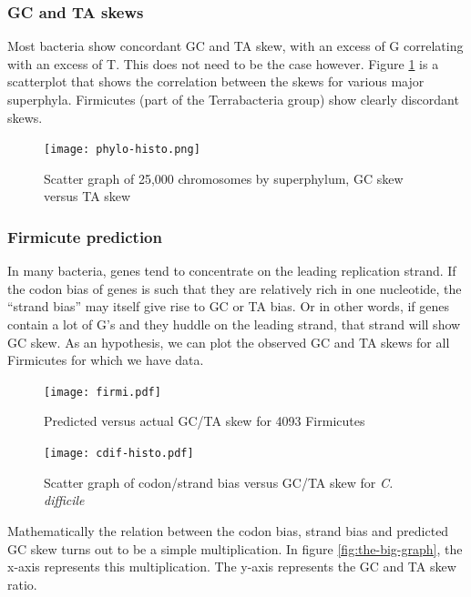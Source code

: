 \documentclass[fleqn,10pt]{wlscirep}
\begin{document}
\subsubsection*{GC and TA skews}
Most bacteria show concordant GC and TA skew, with an excess of G correlating with an excess of T. This does not need to be the case however. Figure \ref{fig:gc-ta-scatter} is a scatterplot that shows the correlation between the skews for various major superphyla. Firmicutes (part of the Terrabacteria group) show clearly discordant skews.

\begin{figure}[ht]
\centering
\texttt{[image: phylo-histo.png]}
\caption{Scatter graph of 25,000 chromosomes by superphylum, GC skew versus TA skew}
\label{fig:gc-ta-scatter}
\end{figure}


\subsubsection*{Firmicute prediction}
In many bacteria, genes tend to concentrate on the leading replication strand. If the codon bias of genes is such that they are relatively rich in one nucleotide, the ``strand bias'' may itself give rise to GC or TA bias. Or in other words, if genes contain a lot of G's and they huddle on the leading strand, that strand will show GC skew. As an hypothesis, we can plot the observed GC and TA skews for all Firmicutes for which we have data.

\begin{figure}[ht]
  \centering
    \begin{minipage}[b]{0.45\linewidth}
      \texttt{[image: firmi.pdf]}
      \caption{Predicted versus actual GC/TA skew for 4093 Firmicutes}
      \label{fig:the-big-graph}
    \end{minipage}
    \quad
    \begin{minipage}[b]{0.45\linewidth}
      \texttt{[image: cdif-histo.pdf]}
      \caption{Scatter graph of codon/strand bias versus GC/TA skew for \emph{C. difficile}}
      \label{fig:cdif-scatter}
    \end{minipage}
\end{figure}


Mathematically the relation between the codon bias, strand bias and predicted GC skew turns out to be a simple multiplication. In figure \ref{fig:the-big-graph}, the x-axis represents this multiplication. The y-axis represents the GC and TA skew ratio. 
\end{document}
